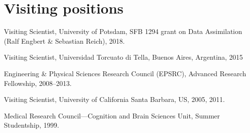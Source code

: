 \documentclass[a4paper, 10pt]{article}
\renewenvironment{itemize}{
  \begin{list}{}{
    \setlength{\leftmargin}{1.5em}
  }
}{
  \end{list}
}
\begin{document}
\section*{Visiting positions}
\begin{itemize}
	\item Visiting Scientist, University of Potsdam, SFB 1294 grant on Data Assimilation (Ralf Engbert \& Sebastian Reich), 2018.
	\item Visiting Scientist, Universidad Torcuato di Tella, Buenos Aires, Argentina, 2015
	\item Engineering \& Physical Sciences Research Council (EPSRC), Advanced Research Fellowship, 2008--2013.
	\item Visiting Scientist, University of California Santa Barbara, US, 2005, 2011.
	\item Medical Research Council---Cognition and Brain Sciences Unit, Summer Studentship, 1999.
\end{itemize}
\end{document}
